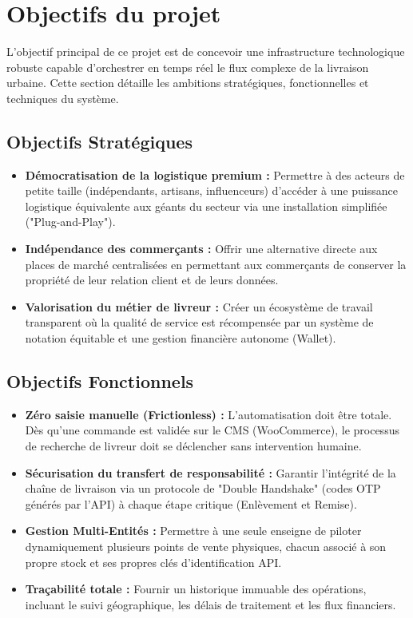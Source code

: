 \newpage

\section{Objectifs du projet}

L'objectif principal de ce projet est de concevoir une infrastructure technologique robuste capable d'orchestrer en temps réel le flux complexe de la livraison urbaine. Cette section détaille les ambitions stratégiques, fonctionnelles et techniques du système.

\subsection{Objectifs Stratégiques}
\begin{itemize}
    \item \textbf{Démocratisation de la logistique premium :} Permettre à des acteurs de petite taille (indépendants, artisans, influenceurs) d'accéder à une puissance logistique équivalente aux géants du secteur via une installation simplifiée ("Plug-and-Play").
    \item \textbf{Indépendance des commerçants :} Offrir une alternative directe aux places de marché centralisées en permettant aux commerçants de conserver la propriété de leur relation client et de leurs données.
    \item \textbf{Valorisation du métier de livreur :} Créer un écosystème de travail transparent où la qualité de service est récompensée par un système de notation équitable et une gestion financière autonome (Wallet).
\end{itemize}

\subsection{Objectifs Fonctionnels}
\begin{itemize}
    \item \textbf{Zéro saisie manuelle (Frictionless) :} L'automatisation doit être totale. Dès qu'une commande est validée sur le CMS (WooCommerce), le processus de recherche de livreur doit se déclencher sans intervention humaine.
    \item \textbf{Sécurisation du transfert de responsabilité :} Garantir l'intégrité de la chaîne de livraison via un protocole de "Double Handshake" (codes OTP générés par l'API) à chaque étape critique (Enlèvement et Remise).
    \item \textbf{Gestion Multi-Entités :} Permettre à une seule enseigne de piloter dynamiquement plusieurs points de vente physiques, chacun associé à son propre stock et ses propres clés d'identification API.
    \item \textbf{Traçabilité totale :} Fournir un historique immuable des opérations, incluant le suivi géographique, les délais de traitement et les flux financiers.
\end{itemize}

